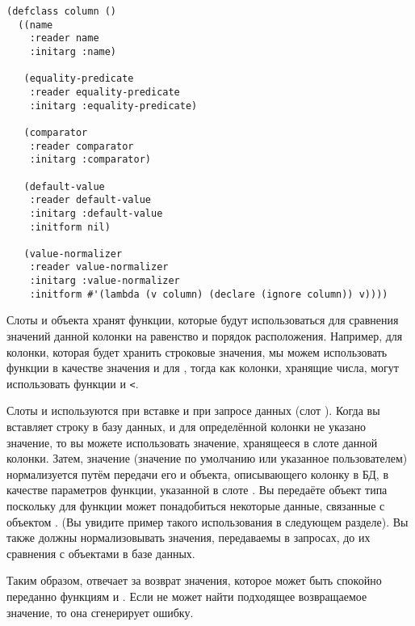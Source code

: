 \begin{lstlisting}
(defclass column ()
  ((name               
    :reader name
    :initarg :name)

   (equality-predicate
    :reader equality-predicate
    :initarg :equality-predicate)

   (comparator
    :reader comparator
    :initarg :comparator)

   (default-value
    :reader default-value
    :initarg :default-value
    :initform nil)

   (value-normalizer
    :reader value-normalizer
    :initarg :value-normalizer
    :initform #'(lambda (v column) (declare (ignore column)) v))))
\end{lstlisting}

Слоты  и  объекта  хранят функции,
которые будут использоваться для сравнения значений данной колонки на равенство и порядок
расположения.  Например, для колонки, которая будет хранить строковые значения, мы можем
использовать функции  в качестве значения  и
 для , тогда как колонки, хранящие числа, могут
использовать функции \code{=} и \lstinline!<!.

Слоты  и  используются при вставке и при
запросе данных (слот ).  Когда вы вставляет строку в базу данных, и
для определённой колонки не указано значение, то вы можете использовать значение,
хранящееся в слоте  данной колонки.  Затем, значение (значение по
умолчанию или указанное пользователем) нормализуется путём передачи его и объекта,
описывающего колонку в БД, в качестве параметров функции, указанной в слоте
.  Вы передаёте объект типа  поскольку для функции
 может понадобиться некоторые данные, связанные с объектом
. (Вы увидите пример такого использования в следующем разделе).  Вы также
должны нормализовывать значения, передаваемы в запросах, до их сравнения с объектами в
базе данных.

Таким образом,  отвечает за возврат значения, которое может быть
спокойно переданно функциям  и .  Если
 не может найти подходящее возвращаемое значение, то она
сгенерирует ошибку.

